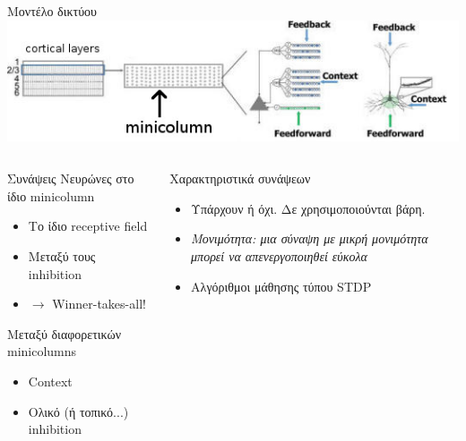 \documentclass[11pt,center]{beamer}
\begin{document}
\begin{frame}{Μοντέλο δικτύου}
  \centering
  \includegraphics[width=.8\textwidth]{../pics/minicolumn}

  \vspace{-0.5em}
  \small{
  \begin{columns}
	\begin{block}{Συνάψεις}
	  Νευρώνες στο ίδιο minicolumn
	  \vspace{-0.5em}
	  \begin{itemize}
		\item Tο ίδιο receptive field
		\item Μεταξύ τους inhibition
		\item[] $\rightarrow$ Winner-takes-all!
	  \end{itemize}

	  \vspace{-0.5em}
	  Μεταξύ διαφορετικών minicolumns
	  \vspace{-0.5em}
	  \begin{itemize}
		\item Context
		\item Ολικό (ή τοπικό...) inhibition
	  \end{itemize}
	\end{block}

	\begin{block}{Χαρακτηριστικά συνάψεων}
	  \vspace{-0.5em}
	  \begin{itemize}
		\item \alert{Υπάρχουν ή όχι}. Δε χρησιμοποιούνται βάρη.
		\item \em{Μονιμότητα}: μια σύναψη με μικρή μονιμότητα μπορεί να απενεργοποιηθεί εύκολα
		\item Αλγόριθμοι μάθησης τύπου STDP
	  \end{itemize}
	\end{block}
  \end{columns}
  }
\end{frame}
\end{document}
